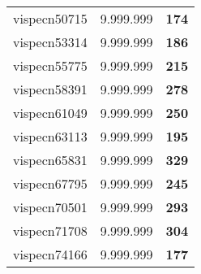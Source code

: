\begin{tabular}{cc||c}
vispecn50715     & 9.999.999        & {\bf 174}       \\ 
vispecn53314     & 9.999.999        & {\bf 186}       \\ 
vispecn55775     & 9.999.999        & {\bf 215}       \\ 
vispecn58391     & 9.999.999        & {\bf 278}       \\ 
vispecn61049     & 9.999.999        & {\bf 250}       \\ 
vispecn63113     & 9.999.999        & {\bf 195}       \\ 
vispecn65831     & 9.999.999        & {\bf 329}       \\ 
vispecn67795     & 9.999.999        & {\bf 245}       \\ 
vispecn70501     & 9.999.999        & {\bf 293}       \\ 
vispecn71708     & 9.999.999        & {\bf 304}       \\ 
vispecn74166     & 9.999.999        & {\bf 177}       \\ 
\end{tabular}